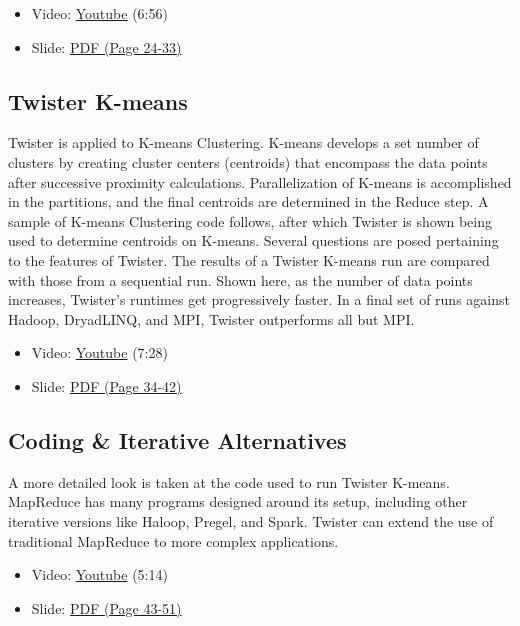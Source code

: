 \begin{itemize}
\tightlist
\item
  Video: \href{https://www.youtube.com/watch?v=n7RVGrC-wcs}{Youtube}
  (6:56)
\item
  Slide:
  \href{https://drive.google.com/open?id=0B88HKpainTSfMFBaNHprbWJwQms}{PDF
  (Page 24-33)}
\end{itemize}

\subsection{Twister K-means}\label{twister-k-means}

Twister is applied to K-means Clustering. K-means develops a set number
of clusters by creating cluster centers (centroids) that encompass the
data points after successive proximity calculations. Parallelization of
K-means is accomplished in the partitions, and the final centroids are
determined in the Reduce step. A sample of K-means Clustering code
follows, after which Twister is shown being used to determine centroids
on K-means. Several questions are posed pertaining to the features of
Twister. The results of a Twister K-means run are compared with those
from a sequential run. Shown here, as the number of data points
increases, Twister's runtimes get progressively faster. In a final set
of runs against Hadoop, DryadLINQ, and MPI, Twister outperforms all but
MPI.

\begin{itemize}
\tightlist
\item
  Video: \href{https://www.youtube.com/watch?v=-G5jlzABo-Y}{Youtube}
  (7:28)
\item
  Slide:
  \href{https://drive.google.com/open?id=0B88HKpainTSfMFBaNHprbWJwQms}{PDF
  (Page 34-42)}
\end{itemize}

\subsection{Coding \& Iterative
Alternatives}\label{coding-iterative-alternatives}

A more detailed look is taken at the code used to run Twister K-means.
MapReduce has many programs designed around its setup, including other
iterative versions like Haloop, Pregel, and Spark. Twister can extend
the use of traditional MapReduce to more complex applications.

\begin{itemize}
\tightlist
\item
  Video: \href{https://www.youtube.com/watch?v=QTCpiwnwjvo}{Youtube}
  (5:14)
\item
  Slide:
  \href{https://drive.google.com/open?id=0B88HKpainTSfMFBaNHprbWJwQms}{PDF
  (Page 43-51)}
\end{itemize}
